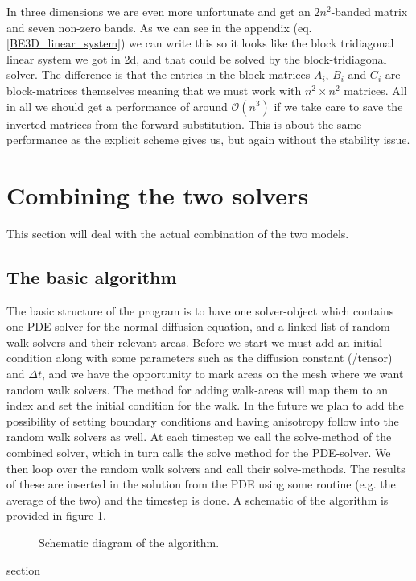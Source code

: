 In three dimensions we are even more unfortunate and get an $2n^2$-banded matrix and seven non-zero bands. 
As we can see in the appendix (eq. \ref{BE3D_linear_system}) we can write this so it looks like the block tridiagonal linear system we got in 2d, and that could be solved by the block-tridiagonal solver. 
The difference is that the entries in the block-matrices $A_i$, $B_i$ and $C_i$ are block-matrices themselves meaning that we must work with $n^2\times n^2$ matrices. 
All in all we should get a performance of around $\mathcal{O}(n^3)$ if we take care to save the inverted matrices from the forward substitution. 
This is about the same performance as the explicit scheme gives us, but again without the stability issue.

\section{Combining the two solvers}\label{combining_the_solvers}
This section will deal with the actual combination of the two models.\\

\subsection{The basic algorithm}\label{basic_algorithm}

The basic structure of the program is to have one solver-object which contains one PDE-solver for the normal diffusion equation, and a linked list of random walk-solvers and their relevant areas. 
Before we start we must add an initial condition along with some parameters such as the diffusion constant (/tensor) and $\Delta t$, and we have the opportunity to mark areas on the mesh where we want random walk solvers. 
The method for adding walk-areas will map them to an index and set the initial condition for the walk. 
In the future we plan to add the possibility of setting boundary conditions and having anisotropy follow into the random walk solvers as well.
At each timestep we call the solve-method of the combined solver, which in turn calls the solve method for the PDE-solver. 
We then loop over the random walk solvers and call their solve-methods. 
The results of these are inserted in the solution from the PDE using some routine (e.g. the average of the two) and the timestep is done. 
A schematic of the algorithm is provided in figure \ref{schematic}.

\begin{figure}[H]
\centering
\caption[Algorithm]{Schematic diagram of the algorithm.}
\label{schematic}
\end{figure}
section
